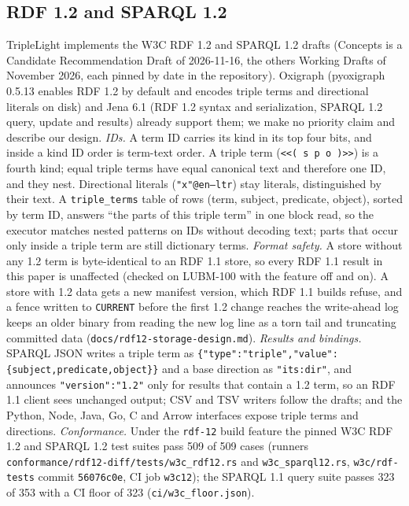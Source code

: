 \documentclass[sigconf, nonacm]{acmart}
\begin{document}
\subsection{RDF 1.2 and SPARQL 1.2}
TripleLight implements the W3C RDF 1.2 and SPARQL 1.2 drafts (Concepts is a Candidate Recommendation Draft of 2026-11-16, the others Working Drafts of November 2026, each pinned by date in the repository). Oxigraph (pyoxigraph 0.5.13 enables RDF 1.2 by default and encodes triple terms and directional literals on disk) and Jena 6.1 (RDF 1.2 syntax and serialization, SPARQL 1.2 query, update and results) already support them; we make no priority claim and describe our design.
\emph{IDs.} A term ID carries its kind in its top four bits, and inside a kind ID order is term-text order. A triple term (\texttt{<<( s p o )>>}) is a fourth kind; equal triple terms have equal canonical text and therefore one ID, and they nest. Directional literals (\texttt{"x"@en--ltr}) stay literals, distinguished by their text. A \texttt{triple\_terms} table of rows (term, subject, predicate, object), sorted by term ID, answers ``the parts of this triple term'' in one block read, so the executor matches nested patterns on IDs without decoding text; parts that occur only inside a triple term are still dictionary terms.
\emph{Format safety.} A store without any 1.2 term is byte-identical to an RDF 1.1 store, so every RDF 1.1 result in this paper is unaffected (checked on LUBM-100 with the feature off and on). A store with 1.2 data gets a new manifest version, which RDF 1.1 builds refuse, and a fence written to \texttt{CURRENT} before the first 1.2 change reaches the write-ahead log keeps an older binary from reading the new log line as a torn tail and truncating committed data (\texttt{docs/rdf12-storage-design.md}).
\emph{Results and bindings.} SPARQL JSON writes a triple term as \texttt{\{"type":"triple","value":\{subject,predicate,object\}\}} and a base direction as \texttt{"its:dir"}, and announces \texttt{"version":"1.2"} only for results that contain a 1.2 term, so an RDF 1.1 client sees unchanged output; CSV and TSV writers follow the drafts; and the Python, Node, Java, Go, C and Arrow interfaces expose triple terms and directions.
\emph{Conformance.} Under the \texttt{rdf-12} build feature the pinned W3C RDF 1.2 and SPARQL 1.2 test suites pass 509 of 509 cases (runners \texttt{conformance/rdf12-diff/tests/w3c\_rdf12.rs} and \texttt{w3c\_sparql12.rs}, \texttt{w3c/rdf-tests} commit \texttt{56076c0e}, CI job \texttt{w3c12}); the SPARQL 1.1 query suite passes 323 of 353 with a CI floor of 323 (\texttt{ci/w3c\_floor.json}).
\end{document}
